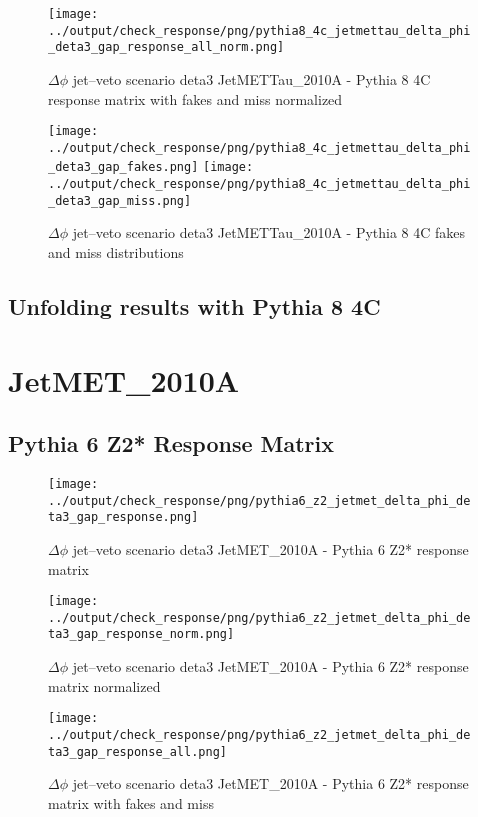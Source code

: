 \documentclass[11pt]{book}
\begin{document}
\begin{figure}[ht]
\centering
\texttt{[image: ../output/check\_response/png/pythia8\_4c\_jetmettau\_delta\_phi\_deta3\_gap\_response\_all\_norm.png]}
\caption{$\Delta\phi$ jet--veto scenario deta3 JetMETTau\_2010A - Pythia 8 4C response matrix with fakes and miss normalized}
\label{p8_jetmettau_delta_phi_deta3_gap_response_all_norm}
\end{figure}

\begin{figure}[ht]
\centering
\texttt{[image: ../output/check\_response/png/pythia8\_4c\_jetmettau\_delta\_phi\_deta3\_gap\_fakes.png]}
\texttt{[image: ../output/check\_response/png/pythia8\_4c\_jetmettau\_delta\_phi\_deta3\_gap\_miss.png]}
\caption{$\Delta\phi$ jet--veto scenario deta3 JetMETTau\_2010A - Pythia 8 4C fakes and miss distributions}
\label{p8_jetmettau_delta_phi_deta3_gap_fakesmiss}
\end{figure}


\clearpage
\subsection{Unfolding results with Pythia 8 4C}


\section{JetMET\_2010A}
\subsection{Pythia 6 Z2* Response Matrix}

\begin{figure}[ht]
\centering
\texttt{[image: ../output/check\_response/png/pythia6\_z2\_jetmet\_delta\_phi\_deta3\_gap\_response.png]}
\caption{$\Delta\phi$ jet--veto scenario deta3 JetMET\_2010A - Pythia 6 Z2* response matrix}
\label{p6_jetmet_delta_phi_deta3_gap_response}
\end{figure}

\begin{figure}[ht]
\centering
\texttt{[image: ../output/check\_response/png/pythia6\_z2\_jetmet\_delta\_phi\_deta3\_gap\_response\_norm.png]}
\caption{$\Delta\phi$ jet--veto scenario deta3 JetMET\_2010A - Pythia 6 Z2* response matrix normalized}
\label{p6_jetmet_delta_phi_deta3_gap_response_norm}
\end{figure}

\begin{figure}[ht]
\centering
\texttt{[image: ../output/check\_response/png/pythia6\_z2\_jetmet\_delta\_phi\_deta3\_gap\_response\_all.png]}
\caption{$\Delta\phi$ jet--veto scenario deta3 JetMET\_2010A - Pythia 6 Z2* response matrix with fakes and miss}
\label{p6_jetmet_delta_phi_deta3_gap_response_all}
\end{figure}
\end{document}
